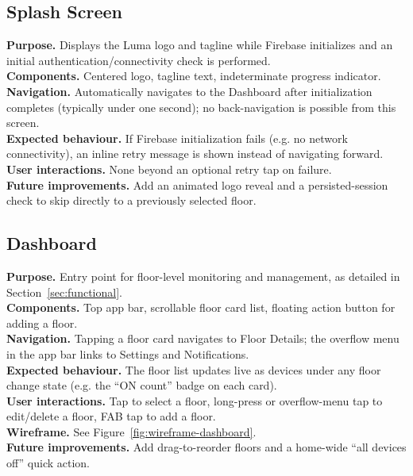 \documentclass[11pt,a4paper]{article}
\begin{document}
\subsection{Splash Screen}
\textbf{Purpose.} Displays the Luma logo and tagline while Firebase initializes and an initial authentication/connectivity check is performed.\\
\textbf{Components.} Centered logo, tagline text, indeterminate progress indicator.\\
\textbf{Navigation.} Automatically navigates to the Dashboard after initialization completes (typically under one second); no back-navigation is possible from this screen.\\
\textbf{Expected behaviour.} If Firebase initialization fails (e.g. no network connectivity), an inline retry message is shown instead of navigating forward.\\
\textbf{User interactions.} None beyond an optional retry tap on failure.\\
\textbf{Future improvements.} Add an animated logo reveal and a persisted-session check to skip directly to a previously selected floor.

\subsection{Dashboard}
\textbf{Purpose.} Entry point for floor-level monitoring and management, as detailed in Section~\ref{sec:functional}.\\
\textbf{Components.} Top app bar, scrollable floor card list, floating action button for adding a floor.\\
\textbf{Navigation.} Tapping a floor card navigates to Floor Details; the overflow menu in the app bar links to Settings and Notifications.\\
\textbf{Expected behaviour.} The floor list updates live as devices under any floor change state (e.g. the ``ON count'' badge on each card).\\
\textbf{User interactions.} Tap to select a floor, long-press or overflow-menu tap to edit/delete a floor, FAB tap to add a floor.\\
\textbf{Wireframe.} See Figure~\ref{fig:wireframe-dashboard}.\\
\textbf{Future improvements.} Add drag-to-reorder floors and a home-wide ``all devices off'' quick action.
\end{document}
